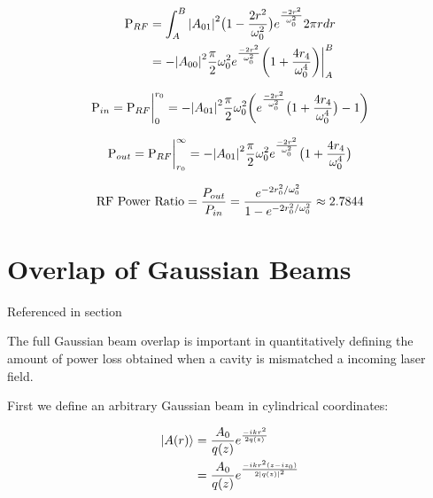 \documentclass[oneside]{book}
\begin{document}
\begin{appendices}
	\begin{equation}
	\begin{split}
	\text{P}_{RF} &= \int_{A}^{B} \abs{A_{01}}^2 \big(1-\frac{2r^2}{\omega_{0}^2}\big) e^{\frac{-2r^2}{\omega_{0}^2}} 2\pi r dr\\
	&= -\abs{A_{00}}^2 \frac{\pi}{2} \omega_{0}^2 e^{\frac{-2r^2}{\omega_{0}^2}} \bigg(1 + \frac{4 r_4}{\omega_{0}^4} \bigg)  \biggr\rvert_A^B
	\end{split}
	\end{equation}
	
	\begin{equation}
	\text{P}_{in} \\
	= \text{P}_{RF} \biggr\rvert_0^{r_0} \\
	= - \abs{A_{01}}^2  \frac{\pi}{2} \omega_{0}^2 \bigg( e^{\frac{-2r^2}{\omega_{0}^2}} \big(1 + \frac{4 r_4}{\omega_{0}^4} \big) - 1 \bigg)
	\end{equation}
	
	\begin{equation}
	\text{P}_{out} \\
	= \text{P}_{RF} \biggr\rvert_{r_0}^{\infty}\\ 
	= - \abs{A_{01}}^2  \frac{\pi}{2} \omega_{0}^2 e^{\frac{-2r^2}{\omega_{0}^2}} \big(1 + \frac{4 r_4}{\omega_{0}^4} \big) 
	\end{equation}
	
	\begin{equation}
	\text{RF Power Ratio} 
	= \frac{P_{out}}{P_{in}} \\
	= \frac{e^{-2r_0^2/ \omega_{0}^2}} {1 - e^{-2r_0^2/ \omega_{0}^2 }} \approx 2.7844
	\end{equation}
	
	\chapter{Overlap of Gaussian Beams}
	
	Referenced in section
	
	The full Gaussian beam overlap is important in quantitatively defining the amount of power loss obtained when a cavity is mismatched a incoming laser field.
	
	First we define an arbitrary Gaussian beam in cylindrical coordinates:
	
	\begin{equation}
	\begin{split}
	\ket{A(r)} 
	&= \frac{A_0}{q(z)} e^{\frac{-ikr^2}{2q(z)}}\\
	&= \frac{A_0}{q(z)} e^{\frac{-ikr^2(z-iz_0)}{2\abs{q(z)}^2}}
	\end{split}
	\end{equation}
	

\end{appendices}
\end{document}
